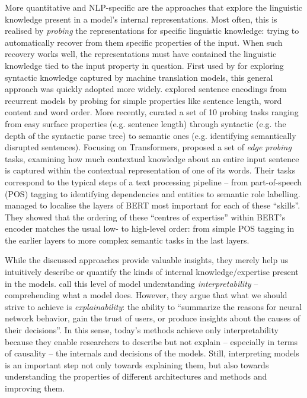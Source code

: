 \documentclass[bsc,frontabs,singlespacing,parskip,deptreport]{infthesis}
\begin{document}
{{    More quantitative and NLP-specific are the approaches that explore the linguistic knowledge present in a model's internal representations.
    Most often, this is realised by \textit{probing} the representations for specific linguistic knowledge: trying to automatically recover from them specific properties of the input. When such recovery works well, the representations must have contained the linguistic knowledge tied to the input property in question.
    First used by \citet{Shi_2016} for exploring syntactic knowledge captured by machine translation models, this general approach was quickly adopted more widely.
    \citet{Adi_2017} explored sentence encodings from recurrent models by probing for simple properties like sentence length, word content and word order.
    More recently, \citet{Conneau_2018} curated a set of 10 probing tasks ranging from easy surface properties (e.g. sentence length) through syntactic (e.g. the depth of the syntactic parse tree) to semantic ones (e.g. identifying semantically disrupted sentences).
    Focusing on Transformers, \citet{Tenney_2019a} proposed a set of \textit{edge probing} tasks, examining how much contextual knowledge about an entire input sentence is captured within the contextual representation of one of its words.
    Their tasks correspond to the typical steps of a text processing pipeline -- from part-of-speech (POS) tagging to identifying dependencies and entities to semantic role labelling. 
    \citet{Tenney_2019b} managed to localise the layers of BERT most important for each of these ``skills''. They showed that the ordering of these ``centres of expertise'' within BERT's encoder matches the usual low- to high-level order: from simple POS tagging in the earlier layers to more complex semantic tasks in the last layers.

    While the discussed approaches provide valuable insights, they merely help us intuitively describe or quantify the kinds of internal knowledge/expertise present in the models. 
    \citet{Gilpin_2018} call this level of model understanding \textit{interpretability} -- comprehending what a model does. 
    However, they argue that what we should strive to achieve is \textit{explainability}: the ability to ``summarize the reasons for neural network behavior, gain the trust of users, or produce insights about the causes of their decisions''.
    In this sense, today's methods achieve only interpretability because they enable researchers to describe but not explain -- especially in terms of causality -- the internals and decisions of the models.
    Still, interpreting models is an important step not only towards explaining them, but also towards understanding the properties of different architectures and methods and improving them.
    
}}
\end{document}
